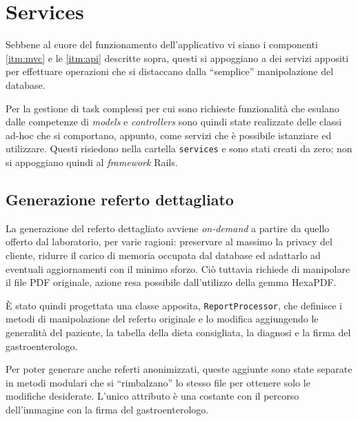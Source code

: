 \section{Services}
Sebbene al cuore del funzionamento dell'applicativo vi siano i componenti \ref{itm:mvc} e le \ref{itm:api} descritte sopra, questi si appoggiano a dei servizi appositi per effettuare operazioni che si distaccano dalla ``semplice'' manipolazione del database.

Per la gestione di task complessi per cui sono richieste funzionalità che esulano dalle competenze di \textit{models} e \textit{controllers} sono quindi state realizzate delle classi ad-hoc che si comportano, appunto, come servizi che è possibile istanziare ed utilizzare. Questi risiedono nella cartella \texttt{services} e sono stati creati da zero; non si appoggiano quindi al \textit{framework} Rails.
\subsection{Generazione referto dettagliato}
La generazione del referto dettagliato avviene \textit{on-demand} a partire da quello offerto dal laboratorio, per varie ragioni: preservare al massimo la privacy del cliente, ridurre il carico di memoria occupata dal database ed adattarlo ad eventuali aggiornamenti con il minimo sforzo. Ciò tuttavia richiede di manipolare il file PDF originale, azione resa possibile dall'utilizzo della gemma HexaPDF.

È stato quindi progettata una classe apposita, \texttt{ReportProcessor}, che definisce i metodi di manipolazione del referto originale e lo modifica aggiungendo le generalità del paziente, la tabella della dieta consigliata, la diagnosi e la firma del gastroenterologo. 

Per poter generare anche referti anonimizzati, queste aggiunte sono state separate in metodi modulari che si ``rimbalzano'' lo stesso file per ottenere solo le modifiche desiderate. L'unico attributo è una costante con il percorso dell'immagine con la firma del gastroenterologo.

